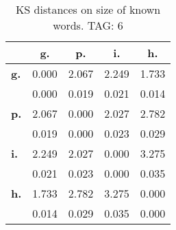 \begin{table}[h!]
\begin{center}
\begin{tabular}{| l || c | c | c | c |}\hline
 & {\bf g.} & {\bf p.} & {\bf i.} & {\bf h.} \\\hline\hline
{\bf g.} & 0.000 & 2.067 & 2.249 & 1.733 \\
{\bf } & 0.000 & 0.019 & 0.021 & 0.014 \\\hline
{\bf p.} & 2.067 & 0.000 & 2.027 & 2.782 \\
{\bf } & 0.019 & 0.000 & 0.023 & 0.029 \\\hline
{\bf i.} & 2.249 & 2.027 & 0.000 & 3.275 \\
{\bf } & 0.021 & 0.023 & 0.000 & 0.035 \\\hline
{\bf h.} & 1.733 & 2.782 & 3.275 & 0.000 \\
{\bf } & 0.014 & 0.029 & 0.035 & 0.000 \\\hline
\end{tabular}
\caption{KS distances on size of known words. TAG: 6}
\end{center}
\end{table}